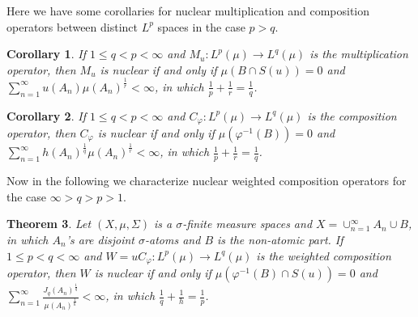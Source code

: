 \documentclass{amsart}
\newtheorem{thm}{Theorem}[section]
\newtheorem{cor}[thm]{Corollary}
\theoremstyle{definition}\newtheorem{defn}[thm]{Definition}
\theoremstyle{remark}
\numberwithin{equation}{section}
\begin{document}
Here we have some corollaries for nuclear multiplication and composition operators between distinct $L^p$ spaces in the case $p>q$.
\begin{cor}
If $1\leq q<p<\infty$  and $M_u:L^p(\mu)\rightarrow L^q(\mu)$ is the multiplication operator, then $M_u$ is nuclear if and only if $\mu(B\cap S(u))=0$ and $\sum^{\infty}_{n=1}u(A_n)\mu(A_n)^{\frac{1}{r}}<\infty$, in which $\frac{1}{p}+\frac{1}{r}=\frac{1}{q}$.
\end{cor}
\begin{cor}
If $1\leq q<p<\infty$  and $C_{\varphi}:L^p(\mu)\rightarrow L^q(\mu)$ is the composition operator, then $C_{\varphi}$ is nuclear if and only if $\mu(\varphi^{-1}(B))=0$ and $\sum^{\infty}_{n=1}h(A_n)^{\frac{1}{q}}\mu(A_n)^{\frac{1}{r}}<\infty$, in which $\frac{1}{p}+\frac{1}{r}=\frac{1}{q}$.
\end{cor}
Now in the following we characterize nuclear weighted composition operators for the case $\infty>q>p>1$.
\begin{thm}\label{n.qp}
Let $(X, \mu, \Sigma)$ is a $\sigma$-finite measure spaces and $X=\cup^{\infty}_{n=1}A_n\cup B$, in which $A_n$'s are disjoint $\sigma$-atoms and $B$ is the non-atomic part. If $1\leq p<q<\infty$  and $W=uC_{\varphi}:L^p(\mu)\rightarrow L^q(\mu)$ is the weighted composition operator, then $W$ is nuclear if and only if $\mu(\varphi^{-1}(B)\cap S(u))=0$ and $\sum^{\infty}_{n=1}\frac{J_q(A_n)^{\frac{1}{q}}}{\mu(A_n)^{\frac{1}{h}}}<\infty$, in which $\frac{1}{q}+\frac{1}{h}=\frac{1}{p}$.
\end{thm}
\end{document}
